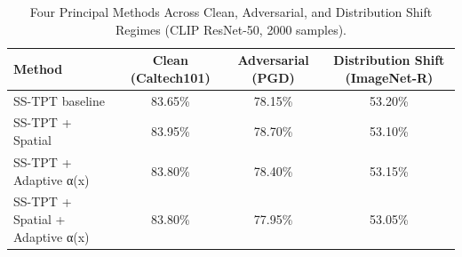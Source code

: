 \begin{table}[ht]
\centering
\caption{Four Principal Methods Across Clean, Adversarial, and Distribution Shift Regimes (CLIP ResNet-50, 2000 samples).}
\label{tab:four_methods}
\begin{tabular}{lccc}
\toprule
\textbf{Method} & \textbf{Clean (Caltech101)} & \textbf{Adversarial (PGD)} & \textbf{Distribution Shift (ImageNet-R)} \\
\midrule
SS-TPT baseline & 83.65\% & 78.15\% & 53.20\% \\
SS-TPT + Spatial & 83.95\% & 78.70\% & 53.10\% \\
SS-TPT + Adaptive α(x) & 83.80\% & 78.40\% & 53.15\% \\
SS-TPT + Spatial + Adaptive α(x) & 83.80\% & 77.95\% & 53.05\% \\
\bottomrule
\end{tabular}
\end{table}
